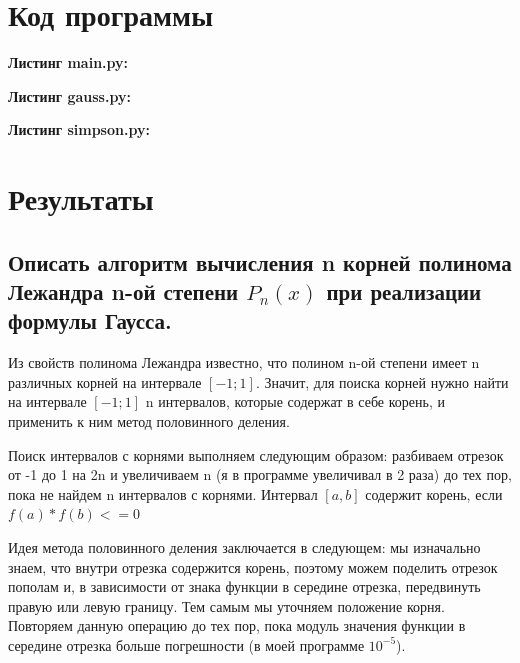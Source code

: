 \documentclass[a4paper,12pt]{article}
\begin{document}
\section{Код программы}
\noindent\textbf{Листинг main.py:}


\noindent\textbf{\newline Листинг gauss.py:}


\noindent\textbf{\newline Листинг simpson.py:}


\section{Результаты}
\subsection{Описать алгоритм вычисления n корней полинома Лежандра n-ой степени $P_n(x)$ при реализации формулы Гаусса.}

Из свойств полинома Лежандра известно, что полином n-ой степени имеет n различных корней на интервале $[-1; 1]$. Значит, для поиска корней нужно найти на интервале $[-1; 1]$ n интервалов, которые содержат в себе корень, и применить к ним метод половинного деления.

Поиск интервалов с корнями выполняем следующим образом: разбиваем отрезок от -1 до 1 на 2n и увеличиваем n (я в программе увеличивал в 2 раза) до тех пор, пока не найдем n интервалов с корнями. Интервал $[a, b]$ содержит корень, если $f(a) * f(b) <= 0$

Идея метода половинного деления заключается в следующем: мы изначально знаем, что внутри отрезка содержится корень, поэтому можем поделить отрезок пополам и, в зависимости от знака функции в середине отрезка, передвинуть правую или левую границу. Тем самым мы уточняем положение корня. Повторяем данную операцию до тех пор, пока модуль значения функции в середине отрезка больше погрешности (в моей программе $10^{-5}$).
\end{document}
